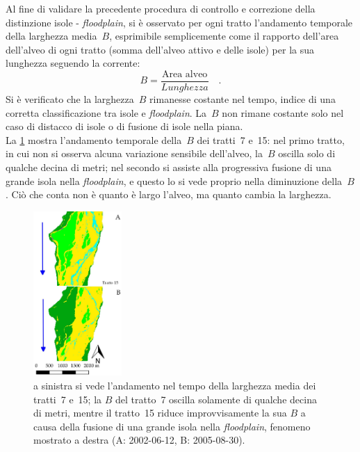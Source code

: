 \begin{description}
Al fine di validare la precedente procedura di controllo e correzione della distinzione isole - \emph{floodplain}, si è osservato per ogni tratto l'andamento temporale della larghezza media~$B$, esprimibile semplicemente come il rapporto dell'area dell'alveo di ogni tratto (somma dell'alveo attivo e delle isole) per la sua lunghezza seguendo la corrente:
	\begin{equation}
		\label{eq:larghezza-tratto}
		B = \frac{\text{Area alveo}}{Lunghezza} 
		\quad .
	\end{equation}
	Si è verificato che la larghezza~$B$ rimanesse costante nel tempo, indice di una corretta classificazione tra isole e \emph{floodplain}. 
	La~$B$ non rimane costante solo nel caso di distacco di isole o di fusione di isole nella piana. 
	\\
	La \cref{fig:b-media-7-e-15} mostra l'andamento temporale della~$B$ dei tratti~7 e~15: nel primo tratto, in cui non si osserva alcuna variazione sensibile dell'alveo, la~$B$ oscilla solo di qualche decina di metri; nel secondo si assiste alla progressiva fusione di una grande isola nella \emph{floodplain}, e questo lo si vede proprio nella diminuzione della~$B$. Ciò che conta non è quanto è largo l'alveo, ma quanto cambia la larghezza.
	\begin{figure}
		\centering
		
		\quad
		\includegraphics[width=0.3\textwidth]{files/fusione_isola_tr_15.jpeg}
		\caption[andamento temporale di $B$ per i tratti~7 e~15]{a sinistra si vede l'andamento nel tempo della larghezza media dei tratti~7 e~15; la $B$ del tratto~7 oscilla solamente di qualche decina di metri, mentre il tratto~15 riduce improvvisamente la sua $B$ a causa della fusione di una grande isola nella \emph{floodplain}, fenomeno mostrato a destra (A: 2002-06-12, B: 2005-08-30).}
		\label{fig:b-media-7-e-15}

\end{figure}
\end{description}
